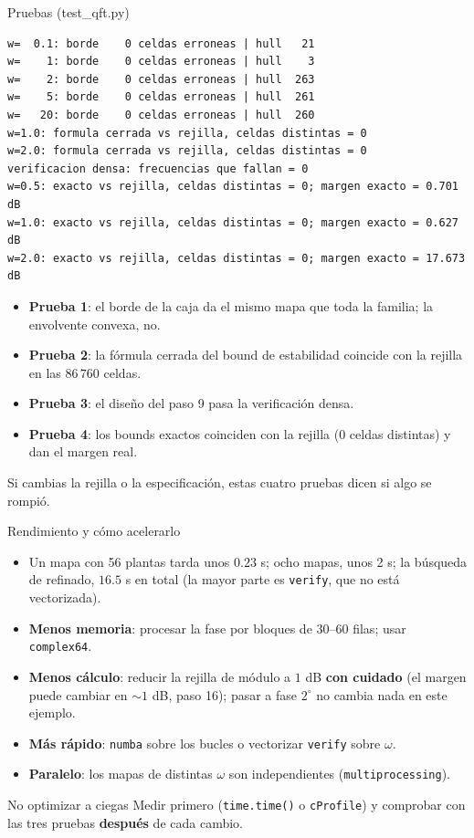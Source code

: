 \documentclass[aspectratio=169,11pt]{beamer}
\begin{document}
\begin{frame}[fragile]{Pruebas (test\_qft.py)}
  \footnotesize
  \begin{verbatim}
w=  0.1: borde    0 celdas erroneas | hull   21
w=    1: borde    0 celdas erroneas | hull    3
w=    2: borde    0 celdas erroneas | hull  263
w=    5: borde    0 celdas erroneas | hull  261
w=   20: borde    0 celdas erroneas | hull  260
w=1.0: formula cerrada vs rejilla, celdas distintas = 0
w=2.0: formula cerrada vs rejilla, celdas distintas = 0
verificacion densa: frecuencias que fallan = 0
w=0.5: exacto vs rejilla, celdas distintas = 0; margen exacto = 0.701 dB
w=1.0: exacto vs rejilla, celdas distintas = 0; margen exacto = 0.627 dB
w=2.0: exacto vs rejilla, celdas distintas = 0; margen exacto = 17.673 dB
  \end{verbatim}
  \begin{itemize}
    \item \textbf{Prueba 1}: el borde de la caja da el mismo mapa que toda la familia; la envolvente convexa, no.
    \item \textbf{Prueba 2}: la fórmula cerrada del bound de estabilidad coincide con la rejilla en las $86\,760$ celdas.
    \item \textbf{Prueba 3}: el diseño del paso 9 pasa la verificación densa.
    \item \textbf{Prueba 4}: los bounds exactos coinciden con la rejilla (0 celdas distintas) y dan el margen real.
  \end{itemize}
  \scriptsize Si cambias la rejilla o la especificación, estas cuatro pruebas dicen si algo se rompió.
\end{frame}

\begin{frame}{Rendimiento y cómo acelerarlo}
  \small
  \begin{itemize}
    \item Un mapa con 56 plantas tarda unos $0.23$ s; ocho mapas, unos 2 s; la búsqueda de refinado, $16.5$ s en total (la mayor parte es \texttt{verify}, que no está vectorizada).
    \item \textbf{Menos memoria}: procesar la fase por bloques de 30--60 filas; usar \texttt{complex64}.
    \item \textbf{Menos cálculo}: reducir la rejilla de módulo a $1$ dB \textbf{con cuidado} (el margen puede cambiar en $\sim1$ dB, paso 16); pasar a fase $2^\circ$ no cambia nada en este ejemplo.
    \item \textbf{Más rápido}: \texttt{numba} sobre los bucles o vectorizar \texttt{verify} sobre $\omega$.
    \item \textbf{Paralelo}: los mapas de distintas $\omega$ son independientes (\texttt{multiprocessing}).
  \end{itemize}
  \begin{alertblock}{No optimizar a ciegas}
    Medir primero (\texttt{time.time()} o \texttt{cProfile}) y comprobar con las tres pruebas \textbf{después} de cada cambio.
  \end{alertblock}
\end{frame}
\end{document}
